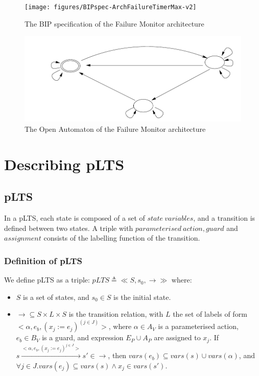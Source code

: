 \documentclass[runningheads,a4paper]{llncs}
\begin{document}
\begin{figure}[t]
  \centering
  \texttt{[image: figures/BIPspec-ArchFailureTimerMax-v2]}
  \caption{The BIP specification of the Failure Monitor architecture}
  \label{schema:ArchFailure:BIP}
\end{figure}

\begin{figure}[t]
  \centering
  \includegraphics[width=0.8\columnwidth]{figures/FailureTimerOA}
  \caption{The Open Automaton of the Failure Monitor architecture}
  \label{schema:ArchFailure:OA}
\end{figure}



\section{Describing pLTS}


\subsection{pLTS}

In a pLTS, each state is composed of a set of $\mathit{state\ variables}$, and a transition is defined between two states. A triple with $\mathit{parameterised\ action}, \mathit{guard}$ and $\mathit{assignment}$ consists of the labelling function of the transition.

\subsubsection{Definition of pLTS}
We define pLTS as a triple: $pLTS\triangleq\ll S, s_{0}, \rightarrow \gg$ where:
\begin{itemize}
	\item $S$ is a set of states, and $s_{0}\in S$ is the initial state.
	\item $\rightarrow \subseteq S\times L\times S$ is the transition relation, with $L$ the set of labels of form $<\alpha, e_{b}, (x_{j} := e_{j})^{(j\in J)}>$, where $\alpha\in A_{V}$ is a parameterised action, $e_{b}\in B_{V}$ is a guard, and expression $E_{P}\cup A_{P}$ are assigned to $x_{j}$. If $s\xrightarrow{<\alpha, e_{b}, (x_{j}:=e_{j})^{j\in J}>}s' \in \rightarrow$, then $vars(e_{b})\subseteq vars(s)\cup vars(\alpha)$, and $\forall j\in J. vars(e_{j})\subseteq vars(s)\wedge x_{j}\in vars(s')$.
\end{itemize}
\end{document}
